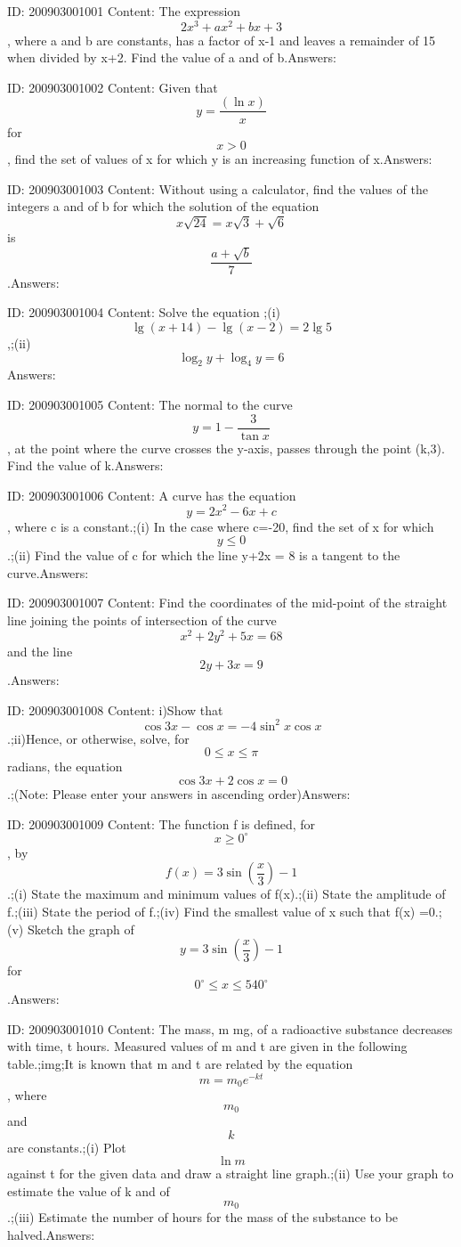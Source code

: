 \documentclass{article}
\begin{document}
ID: 200903001001
Content:
The expression $$2x^3 + ax^2 + bx +3$$, where a and b are constants, has a factor of x-1 and leaves a remainder of 15 when divided by x+2. Find the value of a and of b.Answers:

ID: 200903001002
Content:
Given that $$y = \frac{(\ln x)}{x}$$ for $$x>0$$, find the set of values of x for which y is an increasing function of x.Answers:

ID: 200903001003
Content:
Without using a calculator, find the values of the integers a and of b for which the solution of the equation $$x \sqrt{24} = x \sqrt{3} + \sqrt{6}$$ is $$\frac{a+\sqrt{b}}{7} $$.Answers:

ID: 200903001004
Content:
Solve the equation ;(i) $$\lg (x + 14) - \lg (x -2) = 2 \lg 5$$,;(ii) $$\log_2y +\log_4 y =6$$Answers:

ID: 200903001005
Content:
The normal to the curve $$y=1-\frac{3}{\tan x}$$, at the point where the curve crosses the y-axis, passes through the point (k,3). Find the value of k.Answers:

ID: 200903001006
Content:
A curve has the equation $$y = 2x^2 -6x +c$$, where c is a constant.;(i) In the case where c=-20, find the set of x for which $$y\leq0$$.;(ii) Find the value of c for which the line y+2x = 8 is a tangent to the curve.Answers:

ID: 200903001007
Content:
Find the coordinates of the mid-point of the straight line joining the points of intersection of the curve $$x^2 +2y^2 + 5x =68$$ and the line $$2y+3x=9$$.Answers:

ID: 200903001008
Content:
i)Show that $$\cos  3x -\cos  x = -4\sin ^2x \cos  x$$.;ii)Hence, or otherwise, solve, for $$0 \leq x \leq \pi$$ radians, the equation $$\cos 3x + 2\cos x =0$$.;(Note: Please enter your answers in ascending order)Answers:

ID: 200903001009
Content:
The function f is defined, for $$x \geq 0^{\circ}$$, by $$f(x)=3\sin (\frac{x}{3}) -1$$.;(i) State the maximum and minimum values of f(x).;(ii) State the amplitude of f.;(iii) State the period of f.;(iv) Find the smallest value of x such that f(x) =0.;(v) Sketch the graph of $$y = 3\sin (\frac{x}{3}) -1$$ for $$0^{\circ} \leq x\leq 540^{\circ}$$.Answers:

ID: 200903001010
Content:
The mass,  m mg, of a radioactive substance decreases with time, t hours. Measured values of m and t are given in the following table.;img;It is known that m and t are related by the equation $$m = m_0 e^{-kt}$$, where $$m_0$$ and $$k$$ are constants.;(i)	Plot $$\ln m$$ against t for the given data and draw a straight line graph.;(ii)	Use your graph to estimate the value of k and of $$m_0$$.;(iii)	Estimate the number of hours for the mass of the substance to be halved.Answers:
\end{document}
